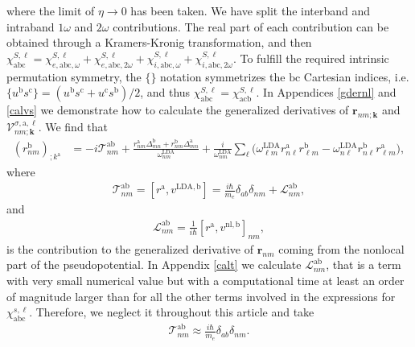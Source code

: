 \noindent where the limit of $\eta\to 0$ has been taken.
We have split the interband and intraband $1\omega$ and $2\omega$
contributions. The real part of each contribution can be obtained through
a Kramers-Kronig transformation,\cite{nicolas} and then
$\chi^{S,\ell}_{\mathrm{abc}}=\chi^{S,\ell}_{e,\mathrm{abc},\omega} 
+\chi^{S,\ell}_{e,\mathrm{abc},2\omega}+\chi^{S,\ell}_{i,\mathrm{abc},\omega}
+\chi^{S,\ell}_{i,\mathrm{abc},2\omega}
$.
To fulfill the required intrinsic permutation symmetry,\cite{rashkeevPRB98} 
the $\{\}$ notation symmetrizes the $\mathrm{b}\mathrm{c}$ Cartesian indices, i.e. 
$\{u^{\mathrm{b}}s^{\mathrm{c}}\}=(u^{\mathrm{b}}s^{\mathrm{c}}+u^{\mathrm{c}}s^{\mathrm{b}})/2$,
and thus
$\chi_{\mathrm{abc}}^{S,\ell}=\chi_{\mathrm{a}\mathrm{c}\mathrm{b}}^{S,\ell}$.
In Appendices \ref{gdernl} and \ref{calvs} we demonstrate how to calculate  
the generalized derivatives of $\mathbf{r}_{nm;\mathbf{k}}$ and
$\mathcal{V}^{\sigma,\mathrm{a},\ell}_{nm;\mathbf{k}}$. 
We find that
\begin{align}\label{rgen.69}
(r^{\mathrm{b}}_{nm})_{;k^{\mathrm{a}}}
&=
-i\mathcal{T}^{\mathrm{a}\mathrm{b}}_{nm}
+
\frac{
r^{\mathrm{a}}_{nm}
\Delta^{\mathrm{b}}_{mn}
+r^{\mathrm{b}}_{nm}
\Delta^{\mathrm{a}}_{mn}
}
{\omega^{\mathrm{LDA}}_{nm}}
+
\frac{i}{\omega^{\mathrm{LDA}}_{nm}}
\sum_{\ell}
\bigg(
\omega^{\mathrm{LDA}}_{\ell m}
r^{\mathrm{a}}_{n\ell}
r^{\mathrm{b}}_{\ell m}
-
\omega^{\mathrm{LDA}}_{n\ell}
r^{\mathrm{b}}_{n\ell}
r^{\mathrm{a}}_{\ell m}
\bigg)
,
\end{align}
where
\begin{align}\label{tau.1}
\mathcal{T}_{nm}^{\mathrm{a}\mathrm{b}}
=
[r^{\mathrm{a}},v^{\mathrm{LDA},\mathrm{b}}]= 
\frac{i\hbar}{m_{e}}\delta_{ab}\delta_{nm} +
\mathcal{L}_{nm}^{\mathrm{a}\mathrm{b}}
,
\end{align}  
and
\begin{align}\label{tau.2}
\mathcal{L}_{nm}^{\mathrm{a}\mathrm{b}}
= \frac{1}{i\hbar}[r^{\mathrm{a}},v^{\mathrm{nl},\mathrm{b}}]_{nm}
,
\end{align}
is the contribution to the generalized derivative of $\mathbf{r}_{nm}$
coming from the nonlocal part of the pseudopotential.
In Appendix \ref{calt} we calculate
$\mathcal{L}^{\mathrm{a}\mathrm{b}}_{nm}$, that
is a term with very small numerical value but with a computational time 
at least an order of magnitude larger
than for all the other terms involved in the expressions for 
$\chi^{s,\ell}_{\mathrm{abc}}$.\cite{valerie}
Therefore, we neglect it throughout this article and take
\begin{align}\label{tau.69}
\mathcal{T}_{nm}^{\mathrm{a}\mathrm{b}}
\approx
\frac{i\hbar}{m_{e}}\delta_{ab}\delta_{nm}
.
\end{align} 
